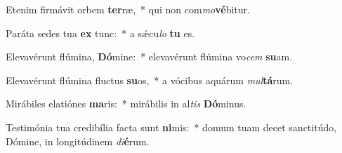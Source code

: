 \item Etenim firmávit orbem \textbf{ter}ræ,~* qui non com\textit{mo}\textbf{vé}bitur.
\item Paráta sedes tua \textbf{ex} tunc:~* a sǽcu\textit{lo} \textbf{tu} es.
\item Elevavérunt flúmina, \textbf{Dó}mine:~* elevavérunt flúmina vo\textit{cem} \textbf{su}am.
\item Elevavérunt flúmina fluctus \textbf{su}os,~* a vócibus aquárum \textit{mul}\textbf{tá}rum.
\item Mirábiles elatiónes \textbf{ma}ris:~* mirábilis in al\textit{tis} \textbf{Dó}minus.
\item Testimónia tua credibília facta sunt \textbf{ni}mis:~* domum tuam decet sanctitúdo, Dómine, in longitúdinem \textit{di}\textbf{é}rum.
